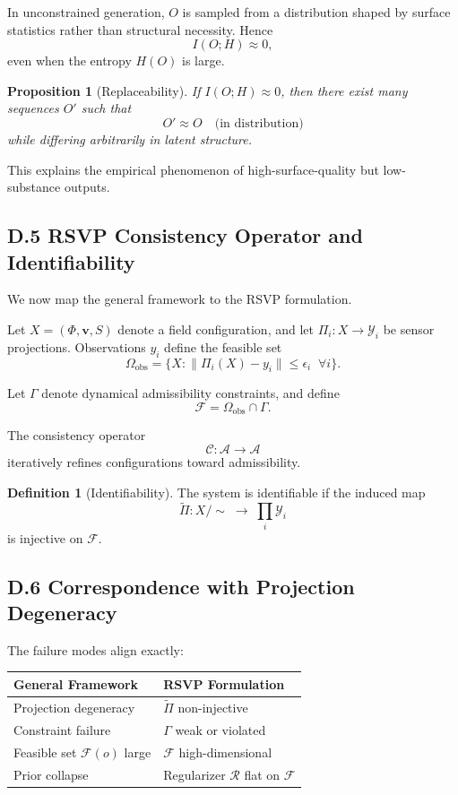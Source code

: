 \documentclass[12pt, oneside]{article}
\theoremstyle{plain}
\newtheorem{proposition}[theorem]{Proposition}
\theoremstyle{definition}
\newtheorem{definition}[theorem]{Definition}
\theoremstyle{remark}
\begin{document}
In unconstrained generation, $O$ is sampled from a distribution shaped by surface statistics rather than structural necessity. Hence
\[
I(O; H) \approx 0,
\]
even when the entropy $H(O)$ is large.

\begin{proposition}[Replaceability]
If $I(O;H) \approx 0$, then there exist many sequences $O'$ such that
\[
O' \approx O \quad \text{(in distribution)}
\]
while differing arbitrarily in latent structure.
\end{proposition}

This explains the empirical phenomenon of high-surface-quality but low-substance outputs.

\subsection{D.5 RSVP Consistency Operator and Identifiability}

We now map the general framework to the RSVP formulation.

Let $X = (\Phi, \mathbf{v}, S)$ denote a field configuration, and let $\Pi_i : X \to \mathcal{Y}_i$ be sensor projections. Observations $y_i$ define the feasible set
\[
\Omega_{\mathrm{obs}} = \{ X : \|\Pi_i(X) - y_i\| \le \epsilon_i \;\; \forall i \}.
\]

Let $\Gamma$ denote dynamical admissibility constraints, and define
\[
\mathcal{F} = \Omega_{\mathrm{obs}} \cap \Gamma.
\]

The consistency operator
\[
\mathcal{C} : \mathcal{A} \to \mathcal{A}
\]
iteratively refines configurations toward admissibility.

\begin{definition}[Identifiability]
The system is identifiable if the induced map
\[
\widetilde{\Pi} : X / \sim \;\to\; \prod_i \mathcal{Y}_i
\]
is injective on $\mathcal{F}$.
\end{definition}

\subsection{D.6 Correspondence with Projection Degeneracy}

The failure modes align exactly:

\begin{center}
\begin{tabular}{ll}
\toprule
General Framework & RSVP Formulation \\
\midrule
Projection degeneracy & $\widetilde{\Pi}$ non-injective \\
Constraint failure & $\Gamma$ weak or violated \\
Feasible set $\mathcal{F}(o)$ large & $\mathcal{F}$ high-dimensional \\
Prior collapse & Regularizer $\mathcal{R}$ flat on $\mathcal{F}$ \\
\bottomrule
\end{tabular}
\end{center}
\end{document}
